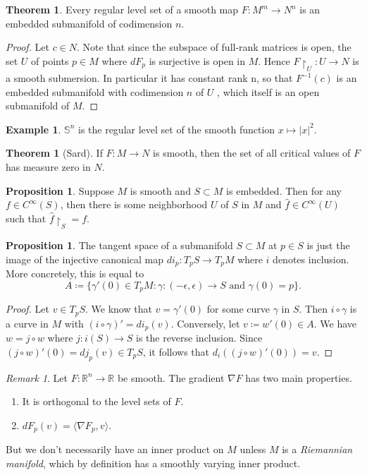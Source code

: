 \documentclass[10pt,letterpaper,cm]{nupset}
\theoremstyle{definition}
\newtheorem{exmp}[definition]{Example}
\theoremstyle{theorem}
\newtheorem{theorem}[definition]{Theorem}
\newtheorem{prop}[definition]{Proposition}
\theoremstyle{remark}
\newtheorem{remark}[definition]{Remark}
\newcommand{\R}{\mathbb R}
\renewcommand{\S}{\mathbb S}
\newcommand{\1}{\mathbf{1}}
\newcommand{\0}{\vec 0}
\begin{document}
\begin{theorem}
Every regular level set of a smooth map $F: M^m \to N^n$ is an embedded submanifold of codimension $n$.
\end{theorem}
\begin{proof}
Let $c \in N$. Note that since the subspace of full-rank matrices is open, the set $U$ of points $p\in M$ where $dF_p$ is surjective is open in $M$. Hence $F\restriction_U : U \to N$ is a smooth submersion. In particular it has constant rank n, so that $F^{-1}(c)$ is an embedded submanifold with codimension $n$ of $U$ , which itself is an open submanifold of $M$.
\end{proof}

\begin{exmp}
$\S^n$ is the regular level set of the smooth function $x\mapsto |x|^2$.
\end{exmp}

\begin{theorem}[Sard]
If $F: M \to N$ is smooth, then the set of all critical values of $F$ has measure zero in $N$.
\end{theorem}

\begin{prop}
Suppose $M$ is smooth and $S\subset M$ is embedded. Then for any $f \in C^{\infty}(S)$, then there is some neighborhood $U$ of $S$ in $M$ and $\hat{f} \in C^{\infty}(U)$ such that $\hat{f}\restriction_S = f$.
\end{prop}
\begin{prop}
The tangent space of a submanifold $S \subset M$ at $p\in S$ is just the image of the injective canonical map $di_p : T_pS \to T_p M$ where $i$ denotes inclusion. More concretely, this is equal to $$A\coloneqq \{ \gamma ' (0) \in T_pM : \gamma : (-\epsilon, \epsilon) \to S \text{ and } \gamma(0) =p\}.$$
\end{prop}
\begin{proof}
Let $v \in T_pS$. We know that $v= \gamma'(0)$ for some curve $\gamma$ in $S$. Then $i \circ \gamma$ is a curve in $M$ with $(i \circ \gamma)'= di_p(v)$. Conversely, let $v\coloneqq  w'(0) \in A$. We have $w = j \circ w$ where $j: i(S) \to S$ is the reverse inclusion. Since $(j \circ w)'(0) = dj_p(v) \in T_pS$, it follows that $d_i((j \circ w)'(0)) = v$.
\end{proof}


\begin{remark}
Let $F: \R^n \to \R$ be smooth. The gradient $\nabla F$ has two main properties.
\begin{enumerate}
\item It is orthogonal to the level sets of $F$.
\item $dF_p(v) = \langle \nabla F_p, v\rangle$.
\end{enumerate}
But we don't necessarily have an inner product on $M$ unless $M$ is a \textit{Riemannian manifold}, which by definition has a smoothly varying inner product. 
\end{remark}
\end{document}
